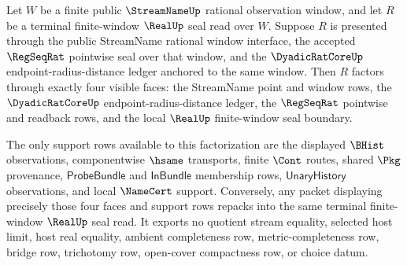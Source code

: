 \begin{theorem}
\label{thm:streamname-regseqrat-dyadic-realup-terminal-pullback-factorization}
Let $W$ be a finite public $\StreamNameUp$ rational observation window, and
let $R$ be a terminal finite-window $\RealUp$ seal read over $W$. Suppose $R$
is presented through the public StreamName rational window interface, the
accepted $\RegSeqRat$ pointwise seal over that window, and the
$\DyadicRatCoreUp$ endpoint-radius-distance ledger anchored to the same
window. Then $R$ factors through exactly four visible faces: the StreamName
point and window rows, the $\DyadicRatCoreUp$ endpoint-radius-distance ledger,
the $\RegSeqRat$ pointwise and readback rows, and the local $\RealUp$
finite-window seal boundary.

The only support rows available to this factorization are the displayed
$\BHist$ observations, componentwise $\hsame$ transports, finite $\Cont$
routes, shared $\Pkg$ provenance, $\mathsf{ProbeBundle}$ and
$\mathsf{InBundle}$ membership rows, $\mathsf{UnaryHistory}$ observations, and
local $\NameCert$ support. Conversely, any packet displaying precisely those
four faces and support rows repacks into the same terminal finite-window
$\RealUp$ seal read. It exports no quotient stream equality, selected host
limit, host real equality, ambient completeness row, metric-completeness row,
bridge row, trichotomy row, open-cover compactness row, or choice datum.
\end{theorem}
